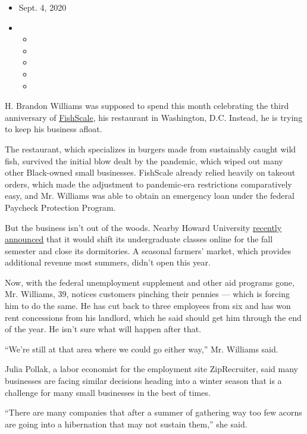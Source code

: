 \begin{itemize}
\item
  Sept. 4, 2020
\item
  \begin{itemize}
  \item
  \item
  \item
  \item
  \item
  \end{itemize}
\end{itemize}

H. Brandon Williams was supposed to spend this month celebrating the
third anniversary of \href{https://www.wearefishscale.com/}{FishScale},
his restaurant in Washington, D.C. Instead, he is trying to keep his
business afloat.

The restaurant, which specializes in burgers made from sustainably
caught wild fish, survived the initial blow dealt by the pandemic, which
wiped out many other Black-owned small businesses. FishScale already
relied heavily on takeout orders, which made the adjustment to
pandemic-era restrictions comparatively easy, and Mr. Williams was able
to obtain an emergency loan under the federal Paycheck Protection
Program.

But the business isn't out of the woods. Nearby Howard University
\href{https://home.howard.edu/reopen}{recently announced} that it would
shift its undergraduate classes online for the fall semester and close
its dormitories. A seasonal farmers' market, which provides additional
revenue most summers, didn't open this year.

Now, with the federal unemployment supplement and other aid programs
gone, Mr. Williams, 39, notices customers pinching their pennies ---
which is forcing him to do the same. He has cut back to three employees
from six and has won rent concessions from his landlord, which he said
should get him through the end of the year. He isn't sure what will
happen after that.

``We're still at that area where we could go either way,'' Mr. Williams
said.

Julia Pollak, a labor economist for the employment site ZipRecruiter,
said many businesses are facing similar decisions heading into a winter
season that is a challenge for many small businesses in the best of
times.

``There are many companies that after a summer of gathering way too few
acorns are going into a hibernation that may not sustain them,'' she
said.

